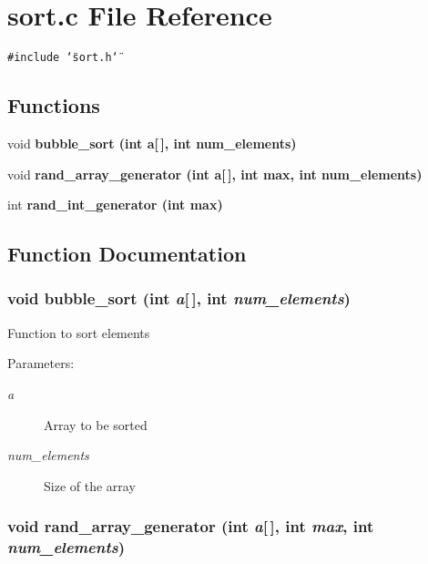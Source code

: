 \section{sort.c File Reference}
\label{sort_8c}
{\tt \#include \char`\"{}sort.h\char`\"{}}\par
\subsection*{Functions}
\begin{CompactItemize}
\item 
void \bf{bubble\_\-sort} (int a[$\,$], int num\_\-elements)
\item 
void \bf{rand\_\-array\_\-generator} (int a[$\,$], int max, int num\_\-elements)
\item 
int \bf{rand\_\-int\_\-generator} (int max)
\end{CompactItemize}


\subsection{Function Documentation}
\subsubsection{\setlength{\rightskip}{0pt plus 5cm}void bubble\_\-sort (int {\em a}[$\,$], int {\em num\_\-elements})}\label{sort_8c_e40725bff7208eca19d61ea6f1dfd024}


Function to sort elements \begin{Desc}
\item[Parameters:]
\begin{description}
\item[{\em a}]Array to be sorted \item[{\em num\_\-elements}]Size of the array \end{description}
\end{Desc}
\subsubsection{\setlength{\rightskip}{0pt plus 5cm}void rand\_\-array\_\-generator (int {\em a}[$\,$], int {\em max}, int {\em num\_\-elements})}\label{sort_8c_68653cbd4df25153bb660c3a2bd4c1c3}


